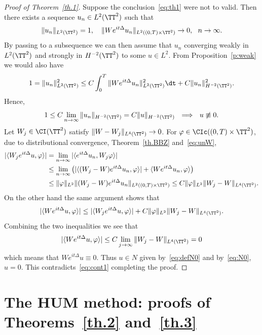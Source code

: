 \begin{proof}[Proof of Theorem~\ref{th.1}]
Suppose the conclusion~\eqref{eq:th1} were not to valid. Then there exists a sequence $ u_n \in L^2 (\TT^2) $ such that
\begin{equation}\label{eq:unW}
\| u_n \|_{ L^2 (\TT^2) } = 1, \ \ \
\| W e^{it \Delta } u_n \|_{ L^2 ((0, T) \times \TT^2) }\to 0, \ \ n
\to \infty.
\end{equation}
By passing to a subsequence we can then assume that $ u_n $ converging weakly in $ L^2 (\TT^2) $ and strongly in $ H^{-2} (\TT^2) $ to some $ u \in L^2 $. From Proposition~\ref{p:weak} we would also have
\[
1 = \| u_n \|_{ L^2 (\TT^2) }^2 \leq C
\int_0^T \| W e^{it \Delta } u_n \|_{ L^2 (\TT^2) }^2 \dt + C \| u_n \|^2_ {H^{-2} (\TT^2) }.
\]
Hence,
\begin{equation}\label{eq:cont1}
1 \leq C \lim_{n \to \infty } \| u_n \|_{H^{-2} (\TT^2) } = C\| u \|_{ H^{-2} (\TT^2) }
\ \ \Longrightarrow \ \ u \not \equiv 0.
\end{equation}
Let $ W_j \in \CI (\TT^2) $ satisfy $ \| W - W_j \|_{L^4 (\TT^2) }
\to 0 $. For $ \varphi \in \CIc ((0, T) \times \TT^2) $, due to distributional convergence, Theorem~\ref{th.BBZ} and~\eqref{eq:unW},
\[
\begin{split} |\langle W_j e^{ it\Delta } u, \varphi \rangle| & = \lim_{ n \to \infty }
|\langle e^{ it \Delta } u_n, W_j \varphi \rangle| \\
&\leq
\lim_{ n \to \infty }
\left(| \langle (W_j - W) e^{ i t \Delta } u_n, \varphi \rangle | +
\langle W e^{ it \Delta } u_n, \varphi \rangle \right) \\ & \leq
\|\varphi \|_{ L^2 } \| (W_j - W) e^{it \Delta } u_n \|_{L^2 ((0, T) \times
\TT^2) }
\leq C\|\varphi \|_{L^2 } \| W_j - W \|_{L^4(\TT^2) }.
\end{split}
\]
On the other hand the same argument shows that
\[
| \langle W e^{it \Delta }u, \varphi \rangle | \leq | \langle W_j e^{ it \Delta } u, \varphi \rangle | + C \| \varphi\|_{L^2} \| W_j - W \|_{L^4(\TT^2) }.
\]
Combining the two inequalities we see that 
\[
|\langle W e^{it \Delta }u, \varphi \rangle | \leq C
\lim_{ j \to \infty } \| W_j - W \|_{L^4(\TT^2) } = 0
\]
which means that $ W e^{ it \Delta } u \equiv 0 $. Thus $ u \in N $ given by~\eqref{eq:defN0} and by~\eqref{eq:N0}, $ u = 0 $. This contradicts~\eqref{eq:cont1} completing the proof.
\end{proof}


\section{The HUM method: proofs of Theorems~\ref{th.2} and~\ref{th.3}}\label{HUM}

